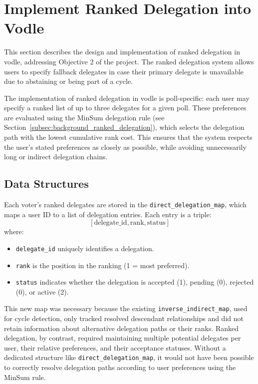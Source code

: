 \section{Implement Ranked Delegation into Vodle}\label{sec:design_ranked_delegation}

This section describes the design and implementation of ranked delegation in vodle, addressing Objective 2 of the project. The ranked delegation system allows users to specify fallback delegates in case their primary delegate is unavailable due to abstaining or being part of a cycle.

The implementation of ranked delegation in vodle is poll-specific: each user may specify a ranked list of up to three delegates for a given poll. These preferences are evaluated using the MinSum delegation rule (see Section~\ref{subsec:background_ranked_delegation}), which selects the delegation path with the lowest cumulative rank cost. This ensures that the system respects the user's stated preferences as closely as possible, while avoiding unnecessarily long or indirect delegation chains.

\subsection{Data Structures}
Each voter's ranked delegates are stored in the \texttt{direct\_delegation\_map}, which maps a user ID to a list of delegation entries. Each entry is a triple:
\[
[\text{delegate\_id}, \text{rank}, \text{status}]
\]
where:
\begin{itemize}
    \item \texttt{delegate\_id} uniquely identifies a delegation.
    \item \texttt{rank} is the position in the ranking (1 = most preferred).
    \item \texttt{status} indicates whether the delegation is accepted (1), pending (0), rejected (0), or active (2).
\end{itemize}

This new map was necessary because the existing \texttt{inverse\_indirect\_map}, used for cycle detection, only tracked resolved descendant relationships and did not retain information about alternative delegation paths or their ranks. Ranked delegation, by contrast, required maintaining multiple potential delegates per user, their relative preferences, and their acceptance statuses. Without a dedicated structure like \texttt{direct\_delegation\_map}, it would not have been possible to correctly resolve delegation paths according to user preferences using the MinSum rule.

